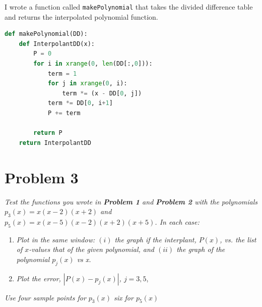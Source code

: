 \documentclass[12pt]{article}
\begin{document}
\noindent I wrote a function called {\tt makePolynomial} that takes the divided difference table and returns the interpolated polynomial function.
\begin{lstlisting}[language=Python, caption=Forming Polynomials from Divided Difference Tables]
def makePolynomial(DD):
    def InterpolantDD(x):
        P = 0
        for i in xrange(0, len(DD[:,0])):
            term = 1
            for j in xrange(0, i):
                term *= (x - DD[0, j])
            term *= DD[0, i+1]
            P += term
    
        return P
    return InterpolantDD
\end{lstlisting}

\section*{Problem 3}
{\it Test the functions you wrote in {\bf Problem 1} and {\bf Problem 2} with the polynomials $p_3(x) = x(x-2)(x+2)$ and $p_5(x) = x(x-5)(x-2)(x+2)(x+5)$.  In each case:}
\begin{enumerate}[\ \ (a)\ \ ]
\item {\it Plot in the same window: $(i)$ the graph if the interplant, $P(x)$, vs. the list of $x$-values that of the given polynomial, and $(ii)$ the graph of the polynomial $p_j(x)$ vs x.}

\item {\it Plot the error, $|P(x) - p_j(x)|$, $j = 3, 5$},

\end{enumerate}
{\it Use four sample points for $p_3(x)$ six for $ p_5(x)$}\\
\end{document}
